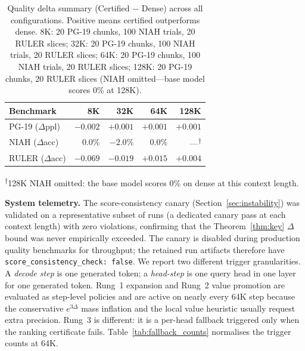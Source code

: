 \documentclass[10pt,twocolumn,a4paper]{article}
\theoremstyle{definition}
\theoremstyle{remark}
\begin{document}
\begin{table}[ht]
\centering
\caption{Quality delta summary (Certified $-$ Dense) across all configurations.  Positive means certified outperforms dense.  8K: 20 PG-19 chunks, 100 NIAH trials, 20 RULER slices; 32K: 20 PG-19 chunks, 100 NIAH trials, 20 RULER slices; 64K: 20 PG-19 chunks, 100 NIAH trials, 20 RULER slices; 128K: 20 PG-19 chunks, 20 RULER slices (NIAH omitted---base model scores 0\% at 128K).}
\label{tab:delta_summary}
\footnotesize
\begin{tabular}{lrrrr}
\toprule
\textbf{Benchmark} & \textbf{8K} & \textbf{32K} & \textbf{64K} & \textbf{128K} \\
\midrule
PG-19 ($\Delta$ppl) & $-0.002$ & $+0.001$ & $+0.001$ & $+0.001$ \\
NIAH ($\Delta$acc)   & $0.0\%$ & $-2.0\%$ & $0.0\%$ & ---\textsuperscript{$\dagger$} \\
RULER ($\Delta$acc)  & $-0.069$ & $-0.019$ & $+0.015$ & $+0.004$ \\
\bottomrule
\end{tabular}

{\footnotesize \textsuperscript{$\dagger$}128K NIAH omitted: the base model scores 0\% on dense at this context length.}
\end{table}

\textbf{System telemetry.}  The score-consistency canary (Section~\ref{sec:instability}) was validated on a representative subset of runs (a dedicated canary pass at each context length) with zero violations, confirming that the Theorem~\ref{thm:key} $\Delta$ bound was never empirically exceeded.  The canary is disabled during production quality benchmarks for throughput; the retained run artifacts therefore have \texttt{score\_consistency\_check: false}.  We report two different trigger granularities.  A \emph{decode step} is one generated token; a \emph{head-step} is one query head in one layer for one generated token.  Rung~1 expansion and Rung~2 value promotion are evaluated as step-level policies and are active on nearly every 64K step because the conservative $e^{3\Delta}$ mass inflation and the local value heuristic usually request extra precision.  Rung~3 is different: it is a per-head fallback triggered only when the ranking certificate fails.  Table~\ref{tab:fallback_counts} normalises the trigger counts at 64K.
\end{document}
